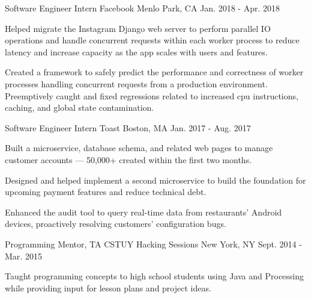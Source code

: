 \begin{cventries}
  \cventry
    {Software Engineer Intern} %
    {Facebook} %
    {Menlo Park, CA} %
    {Jan. 2018 - Apr. 2018} %
    {
      \begin{cvitems} %
        \item {Helped migrate the Instagram Django web server to perform parallel IO operations and handle concurrent requests within each worker process to reduce latency and increase capacity as the app scales with users and features.}
		\item {Created a framework to safely predict the performance and correctness of worker processes handling concurrent requests from a production environment. Preemptively caught and fixed regressions related to increased cpu instructions, caching, and global state contamination.}
      \end{cvitems}
    }

  \cventry
    {Software Engineer Intern} %
    {Toast} %
    {Boston, MA} %
    {Jan. 2017 - Aug. 2017} %
    {
      \begin{cvitems} %
        \item {Built a microservice, database schema, and related web pages to manage customer accounts --- 50,000+ created within the first two months.}
		\item {Designed and helped implement a second microservice to build the foundation for upcoming payment features and reduce technical debt.}
		\item {Enhanced the audit tool to query real-time data from restaurants' Android devices, proactively resolving customers' configuration bugs.}
      \end{cvitems}
    }

  \cventry
    {Programming Mentor, TA} %
    {CSTUY Hacking Sessions} %
    {New York, NY} %
    {Sept. 2014 - Mar. 2015} %
    {
      \begin{cvitems} %
        \item {Taught programming concepts to high school students using Java and Processing while providing input for lesson plans and project ideas.}
      \end{cvitems}
    }    
\end{cventries}
